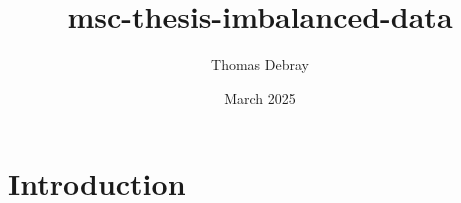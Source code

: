 \documentclass{article}
\title{msc-thesis-imbalanced-data}
\author{Thomas Debray}
\date{March 2025}
\begin{document}
\maketitle

\section{Introduction}
\end{document}

